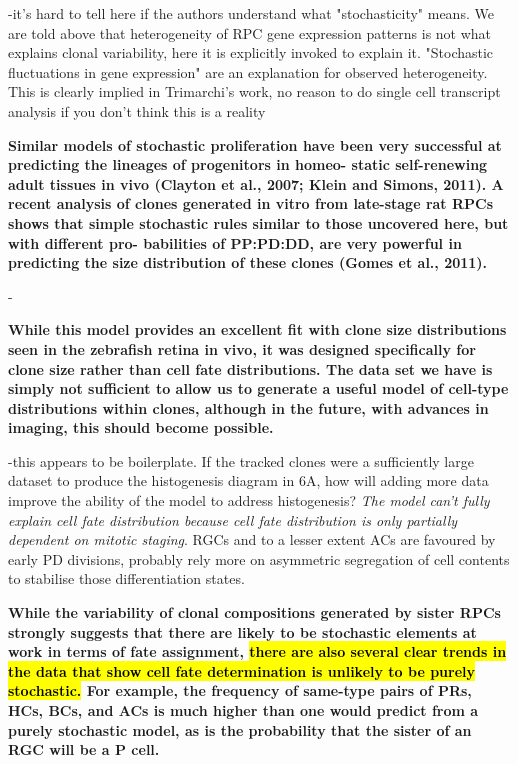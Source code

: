 \bigskip

-it's hard to tell here if the authors understand what "stochasticity" means. We are told above that heterogeneity of RPC gene expression patterns is not what explains clonal variability, here it is explicitly invoked to explain it. "Stochastic fluctuations in gene expression" are an explanation for observed heterogeneity. This is clearly implied in Trimarchi's work, no reason to do single cell transcript analysis if you don't think this is a reality

\bigskip

\textbf{
Similar models of stochastic proliferation have been very
successful at predicting the lineages of progenitors in homeo-
static self-renewing adult tissues in vivo (Clayton et al., 2007;
Klein and Simons, 2011). A recent analysis of clones generated
in vitro from late-stage rat RPCs shows that simple stochastic
rules similar to those uncovered here, but with different pro-
babilities of PP:PD:DD, are very powerful in predicting the size
distribution of these clones (Gomes et al., 2011).}

\bigskip

-

\bigskip

\textbf{While this
model provides an excellent fit with clone size distributions
seen in the zebrafish retina in vivo, it was designed specifically
for clone size rather than cell fate distributions. The data set
we have is simply not sufficient to allow us to generate a useful
model of cell-type distributions within clones, although in the
future, with advances in imaging, this should become possible.}

\bigskip

-this appears to be boilerplate. If the tracked clones were a sufficiently large dataset to produce the histogenesis diagram in 6A, how will adding more data improve the ability of the model to address histogenesis? \textit{The model can't fully explain cell fate distribution because cell fate distribution is only partially dependent on mitotic staging}. RGCs and to a lesser extent ACs are favoured by early PD divisions, probably rely more on asymmetric segregation of cell contents to stabilise those differentiation states.

\bigskip

\textbf{
While the variability of clonal compositions generated by sister
RPCs strongly suggests that there are likely to be stochastic
elements at work in terms of fate assignment, \hl{there are also
several clear trends in the data that show cell fate determination
is unlikely to be purely stochastic.} For example, the frequency of
same-type pairs of PRs, HCs, BCs, and ACs is much higher
than one would predict from a purely stochastic model, as is
the probability that the sister of an RGC will be a P cell.}

